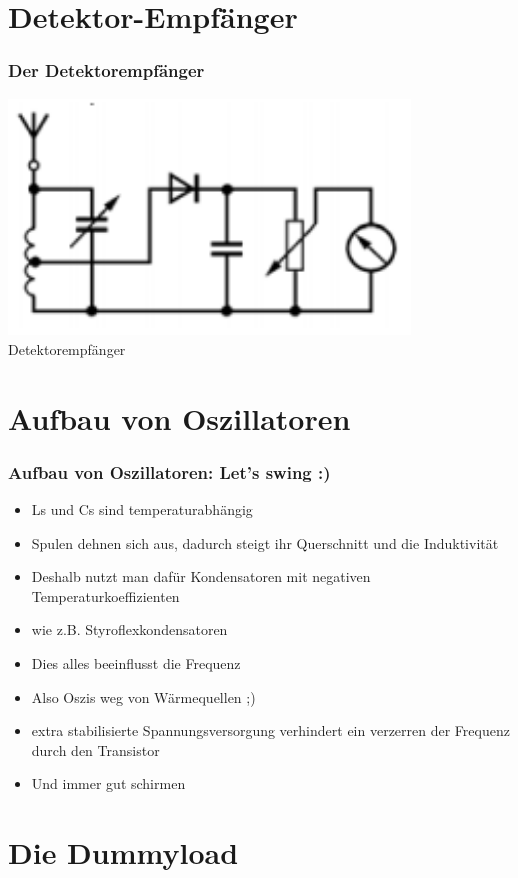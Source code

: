 \section*{Detektor-Empfänger}
\begin{frame}
\frametitle{Der Detektorempfänger}
    \begin{center}
        \includegraphics[width=0.8\textwidth]{a17/TJ601.png}\\
       Detektorempfänger \cite{bna}
    \end{center}
\end{frame}

\section*{Aufbau von Oszillatoren}
\begin{frame}
\frametitle{Aufbau von Oszillatoren: Let's swing :)}
\begin{itemize}
	\item	Ls und Cs sind temperaturabhängig
	\item	Spulen dehnen sich aus, dadurch steigt ihr Querschnitt und die Induktivität
	\item	Deshalb nutzt man dafür Kondensatoren mit negativen Temperaturkoeffizienten
	\item	wie z.B. Styroflexkondensatoren
	\item	Dies alles beeinflusst die Frequenz
	\item	Also Oszis weg von Wärmequellen ;)
	\item	extra stabilisierte Spannungsversorgung verhindert ein verzerren der Frequenz durch den Transistor
	\item	Und immer gut schirmen
\end{itemize}
\end{frame}

\section*{Die Dummyload}

